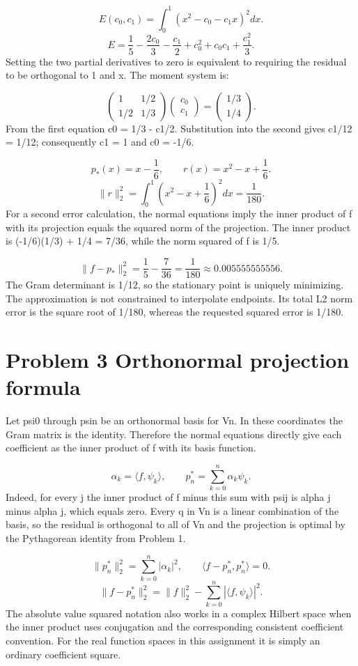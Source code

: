 \documentclass[a4paper,11pt]{article}
\begin{document}
\[E(c_0,c_1)=\int_0^1(x^2-c_0-c_1x)^2dx.\]
\[E=\frac15-\frac{2c_0}{3}-\frac{c_1}{2}+c_0^2+c_0c_1+\frac{c_1^2}{3}.\]
Setting the two partial derivatives to zero is equivalent to requiring the residual to be orthogonal to 1 and x. The moment system is:

\[\begin{pmatrix}1&1/2\\1/2&1/3\end{pmatrix}\begin{pmatrix}c_0\\c_1\end{pmatrix}=\begin{pmatrix}1/3\\1/4\end{pmatrix}.\]
From the first equation c0 = 1/3 - c1/2. Substitution into the second gives c1/12 = 1/12; consequently c1 = 1 and c0 = -1/6.

\[p_*(x)=x-\frac16,\qquad r(x)=x^2-x+\frac16.\]
\[\|r\|_2^2=\int_0^1\left(x^2-x+\frac16\right)^2dx=\frac1{180}.\]
For a second error calculation, the normal equations imply the inner product of f with its projection equals the squared norm of the projection. The inner product is (-1/6)(1/3) + 1/4 = 7/36, while the norm squared of f is 1/5.

\[\|f-p_*\|_2^2=\frac15-\frac7{36}=\frac1{180}\approx0.005555555556.\]
The Gram determinant is 1/12, so the stationary point is uniquely minimizing. The approximation is not constrained to interpolate endpoints. Its total L2 norm error is the square root of 1/180, whereas the requested squared error is 1/180.

\clearpage
\section*{Problem 3 Orthonormal projection formula}
Let psi0 through psin be an orthonormal basis for Vn. In these coordinates the Gram matrix is the identity. Therefore the normal equations directly give each coefficient as the inner product of f with its basis function.

\[\alpha_k=\langle f,\psi_k\rangle,\qquad p_n^*=\sum_{k=0}^{n}\alpha_k\psi_k.\]
Indeed, for every j the inner product of f minus this sum with psij is alpha j minus alpha j, which equals zero. Every q in Vn is a linear combination of the basis, so the residual is orthogonal to all of Vn and the projection is optimal by the Pythagorean identity from Problem 1.

\[\|p_n^*\|_2^2=\sum_{k=0}^{n}|\alpha_k|^2,\qquad \langle f-p_n^*,p_n^*\rangle=0.\]
\[\|f-p_n^*\|_2^2=\|f\|_2^2-\sum_{k=0}^{n}|\langle f,\psi_k\rangle|^2.\]
The absolute value squared notation also works in a complex Hilbert space when the inner product uses conjugation and the corresponding consistent coefficient convention. For the real function spaces in this assignment it is simply an ordinary coefficient square.
\end{document}
